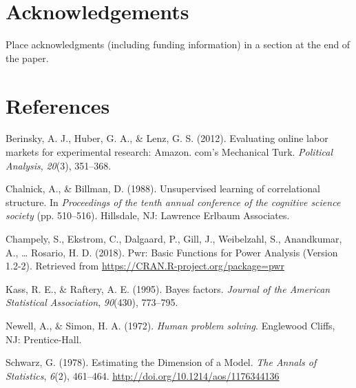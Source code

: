 \documentclass[10pt, letterpaper]{article}
\begin{document}
\section{Acknowledgements}\label{acknowledgements}

Place acknowledgments (including funding information) in a section at
the end of the paper.

\section{References}\label{references}

\setlength{\parindent}{-0.1in} \setlength{\leftskip}{0.125in} \noindent

\hypertarget{refs}{}
\hypertarget{ref-berinskyEvaluatingOnlineLabor2012}{}
Berinsky, A. J., Huber, G. A., \& Lenz, G. S. (2012). Evaluating online
labor markets for experimental research: Amazon. com's Mechanical Turk.
\emph{Political Analysis}, \emph{20}(3), 351--368.

\hypertarget{ref-ChalnickBillman1988a}{}
Chalnick, A., \& Billman, D. (1988). Unsupervised learning of
correlational structure. In \emph{Proceedings of the tenth annual
conference of the cognitive science society} (pp. 510--516). Hillsdale,
NJ: Lawrence Erlbaum Associates.

\hypertarget{ref-champelyPwrBasicFunctions2018}{}
Champely, S., Ekstrom, C., Dalgaard, P., Gill, J., Weibelzahl, S.,
Anandkumar, A., \ldots{} Rosario, H. D. (2018). Pwr: Basic Functions for
Power Analysis (Version 1.2-2). Retrieved from
\url{https://CRAN.R-project.org/package=pwr}

\hypertarget{ref-kassBayesFactors1995a}{}
Kass, R. E., \& Raftery, A. E. (1995). Bayes factors. \emph{Journal of
the American Statistical Association}, \emph{90}(430), 773--795.

\hypertarget{ref-NewellSimon1972a}{}
Newell, A., \& Simon, H. A. (1972). \emph{Human problem solving}.
Englewood Cliffs, NJ: Prentice-Hall.

\hypertarget{ref-schwarzEstimatingDimensionModel1978a}{}
Schwarz, G. (1978). Estimating the Dimension of a Model. \emph{The
Annals of Statistics}, \emph{6}(2), 461--464.
\url{http://doi.org/10.1214/aos/1176344136}


\end{document}
